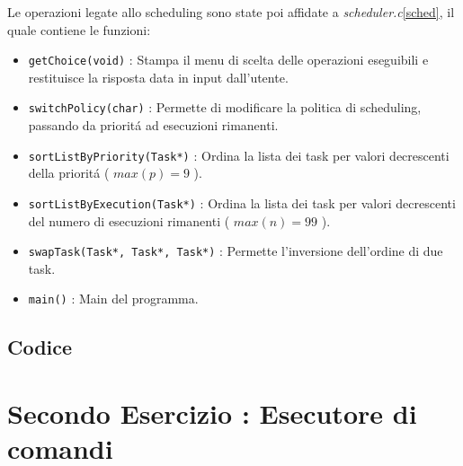 \documentclass[a4paper]{article}
\begin{document}
Le operazioni legate allo scheduling sono state poi affidate a \textit{scheduler.c}\ref{sched}, il quale contiene le funzioni:

\begin{itemize}
\item \texttt{getChoice(void)} : Stampa il menu di scelta delle operazioni eseguibili e restituisce la risposta data in input dall'utente.

\item \texttt{switchPolicy(char)} : Permette di modificare la politica di scheduling, passando da priorit\'a ad esecuzioni rimanenti.

\item \texttt{sortListByPriority(Task*)} : Ordina la lista dei task per valori decrescenti della priorit\'a ( $max(p)=9$ ).

\item \texttt{sortListByExecution(Task*)} : Ordina la lista dei task per valori decrescenti del numero di esecuzioni rimanenti ( $max(n)=99$ ).

\item \texttt{swapTask(Task*, Task*, Task*)} : Permette l'inversione dell'ordine di due task.

\item \texttt{main()} : Main del programma.
\end{itemize}


\subsection{Codice}




\newpage
\section{Secondo Esercizio : Esecutore di comandi}
\end{document}
